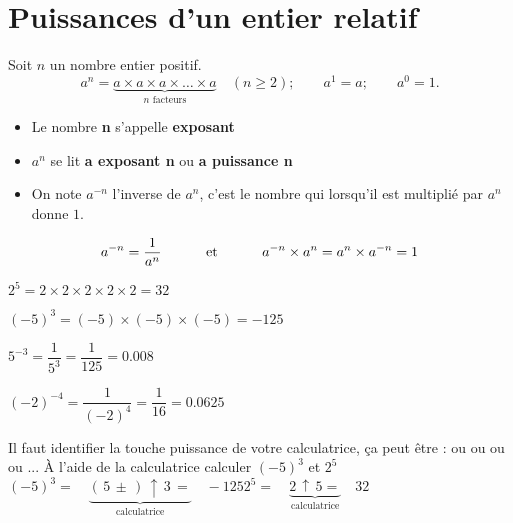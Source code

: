 \section{Puissances d'un entier relatif}
\begin{definition}
Soit $n$ un nombre entier positif.
$$a^n=\underbrace{a\times a\times a\times\dots\times a}_{n\mbox{ facteurs}}\quad (n\geq 2);\qquad a^1=a;\qquad a^0=1.$$
\begin{itemize}
    \item Le nombre \textbf{n} s'appelle \textbf{exposant}
    \item $a^n$ se lit \textbf{a exposant n} ou \textbf{a puissance n}
    \item On note $a^{-n}$ l'inverse de $a^n$, c'est le nombre qui lorsqu'il est multiplié par $a^n$ donne $1$.
\end{itemize}
\smallskip
$$a^{-n}=\dfrac1{a^n} \text{\hspace*{10mm} et \hspace*{10mm}} a^{-n}\times a^n=a^n\times a^{-n}=1$$
\end{definition}

\begin{exemple*1}    

\begin{minipage}{0.45\linewidth}
$2^5=2\times2\times2\times2\times2=32$ \par\vspace{0.25cm}
$(-5)^3=(-5)\times(-5)\times(-5)=-125$
\end{minipage}
\begin{minipage}{0.45\linewidth}
$5^{-3}=\dfrac1{5^3}=\dfrac1{125}=\num{0.008}$ \par\vspace{0.25cm}
$(-2)^{-4}=\dfrac1{(-2)^4}=\dfrac1{16}=\num{0.0625}$
\end{minipage}
\end{exemple*1}

\begin{methode*1}
    Il faut identifier la touche puissance de votre calculatrice, ça peut être : \fbox{$\uparrow$} ou  ou  ou \fbox{$\hat{ }$} ou ...
    \exercice
    À l'aide de la calculatrice calculer $(-5)^3$ et $2^5$
    \correction
    {\hfill$(-5)^3=\quad\underbrace{(\,5\,\pm\,)\,\uparrow\,3\,=}_{\mbox{calculatrice}}\quad-125$\hfill$2^5=\quad\underbrace{2\,\uparrow\,5=}_{\mbox{calculatrice}}\quad32$\hfill}

    \medskip
    {\hfill{} \hfill {}\hfill}
\end{methode*1}


